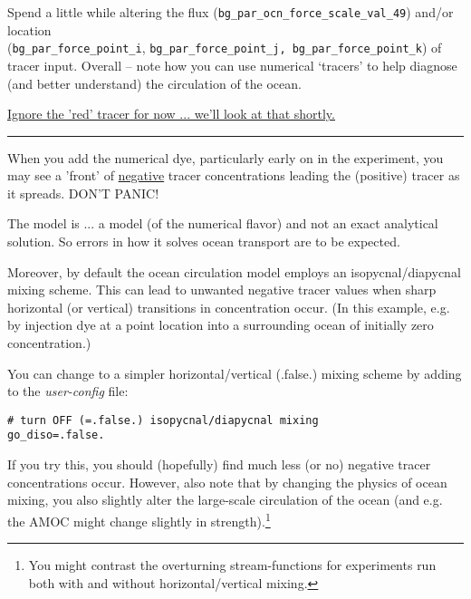 Spend a little while altering the flux (\texttt{\small bg\_par\_ocn\_force\_scale\_val\_49}) and/or location
\\(\texttt{\small bg\_par\_force\_point\_i}, \texttt{\small bg\_par\_force\_point\_j, bg\_par\_force\_point\_k}) of tracer input. Overall -- note how you can use numerical ‘tracers’ to help diagnose (and better understand) the circulation of the ocean.

\large\uline{Ignore the 'red' tracer for now ... we'll look at that shortly.}\normalsize

\vspace{1mm}\noindent\rule{4cm}{0.5pt}\vspace{2mm}

\newpage 
%
\noindent When you add the numerical dye, particularly early on in the experiment, you may see a 'front' of \uline{negative} tracer concentrations leading the (positive) tracer as it spreads. DON'T PANIC!

The model is ... a model (of the numerical flavor) and not an exact analytical solution. So errors in how it solves ocean transport are to be expected.

Moreover, by default the ocean circulation model employs an isopycnal/diapycnal mixing scheme. This can lead to unwanted negative tracer values when sharp horizontal (or vertical) transitions in concentration occur. (In this example, e.g. by injection dye at a point location into a surrounding ocean of initially zero concentration.)

You can change to a simpler horizontal/vertical (.false.) mixing scheme by adding to the \textit{user-config} file:

\vspace{-2mm}\small\begin{verbatim}
# turn OFF (=.false.) isopycnal/diapycnal mixing
go_diso=.false.
\end{verbatim}\normalsize\vspace{-2mm}

If you try this, you should (hopefully) find much less (or no) negative tracer concentrations occur. However, also note that by changing the physics of ocean mixing, you also slightly alter the large-scale circulation of the ocean (and e.g. the AMOC might change slightly in strength).\footnote{You might contrast the overturning stream-functions for experiments run both with and without horizontal/vertical mixing.} 

